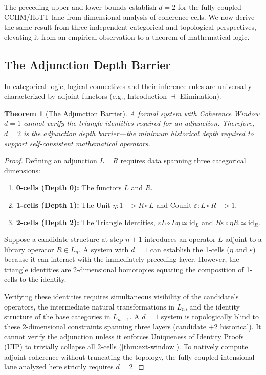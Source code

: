 \documentclass[11pt,a4paper]{article}
\def\to{->}%
\theoremstyle{plain}
\newtheorem{theorem}{Theorem}[section]
\theoremstyle{definition}
\theoremstyle{remark}
\begin{document}
The preceding upper and lower bounds establish $d = 2$ for the fully coupled CCHM/HoTT lane from dimensional analysis of coherence cells.
We now derive the same result from three independent categorical and topological perspectives, elevating it from an empirical observation to a theorem of mathematical logic.

\subsection{The Adjunction Depth Barrier}
\label{sec:event-horizon}

In categorical logic, logical connectives and their inference rules are universally characterized by adjoint functors (e.g., Introduction $\dashv$ Elimination).

\begin{theorem}[The Adjunction Barrier]
\label{thm:adjunction-barrier}
A formal system with Coherence Window $d = 1$ cannot verify the triangle identities required for an adjunction. Therefore, $d = 2$ is the \emph{adjunction depth barrier}---the minimum historical depth required to support self-consistent mathematical operators.
\end{theorem}

\begin{proof}
Defining an adjunction $L \dashv R$ requires data spanning three categorical dimensions:
\begin{enumerate}[label=(\arabic*), nosep]
    \item \textbf{0-cells (Depth 0):} The functors $L$ and $R$.
    \item \textbf{1-cells (Depth 1):} The Unit $\eta : 1 \to R \circ L$ and Counit $\varepsilon : L \circ R \to 1$.
    \item \textbf{2-cells (Depth 2):} The Triangle Identities, $\varepsilon L \circ L\eta \simeq \mathrm{id}_L$ and $R\varepsilon \circ \eta R \simeq \mathrm{id}_R$.
\end{enumerate}

Suppose a candidate structure at step $n+1$ introduces an operator $L$ adjoint to a library operator $R \in L_n$. A system with $d = 1$ can establish the 1-cells ($\eta$ and $\varepsilon$) because it can interact with the immediately preceding layer. However, the triangle identities are 2-dimensional homotopies equating the composition of 1-cells to the identity.

Verifying these identities requires simultaneous visibility of the candidate's operators, the intermediate natural transformations in $L_n$, and the identity structure of the base categories in $L_{n-1}$. A $d = 1$ system is topologically blind to these 2-dimensional constraints spanning three layers (candidate $+ 2$ historical). It cannot verify the adjunction unless it enforces Uniqueness of Identity Proofs (UIP) to trivially collapse all 2-cells (\cref{thm:ext-window}). To natively compute adjoint coherence without truncating the topology, the fully coupled intensional lane analyzed here strictly requires $d = 2$.
\end{proof}
\end{document}
